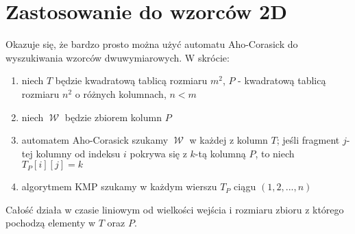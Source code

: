\documentclass{article}
\DeclareMathOperator{\W}{\mathcal{W}}
\begin{document}
\section{Zastosowanie do wzorców 2D}
Okazuje się, że bardzo prosto można użyć automatu Aho-Corasick do wyszukiwania wzorców dwuwymiarowych. W skrócie:
\begin{enumerate}
    \item niech $T$ będzie kwadratową tablicą rozmiaru $m^2$, $P$ - kwadratową tablicą rozmiaru $n^2$ o różnych kolumnach, $n < m$
    \item niech $\W$ będzie zbiorem kolumn $P$
    \item automatem Aho-Corasick szukamy $\W$ w każdej z kolumn $T$; jeśli fragment $j$-tej kolumny od indeksu $i$ pokrywa się z $k$-tą kolumną $P$, to niech $T_P[i][j]=k$
    \item algorytmem KMP szukamy w każdym wierszu $T_P$ ciągu $(1,2,...,n)$
\end{enumerate}
Całość działa w czasie liniowym od wielkości wejścia i rozmiaru zbioru z którego pochodzą elementy w $T$ oraz $P$.
\end{document}
